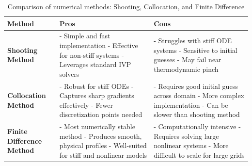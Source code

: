 \documentclass[a4paper,fleqn]{cas-sc}
\begin{document}
    \begin{table}[ht]
        \centering
        \scriptsize
        \renewcommand{\arraystretch}{1.5}
        \caption{Comparison of numerical methods: Shooting, Collocation, and Finite Difference}
        \label{tab:method_comparison_table}
        \begin{tabular}{|>{\centering\arraybackslash}m{3.5cm}|p{6cm}|p{6cm}|}
            \hline
            \textbf{Method} & \textbf{Pros} & \textbf{Cons} \\
            \hline
            \textbf{Shooting Method} &
            - Simple and fast implementation \newline
            - Effective for non-stiff systems \newline
            - Leverages standard IVP solvers
            &
            - Struggles with stiff ODE systems \newline
            - Sensitive to initial guesses \newline
            - May fail near thermodynamic pinch \\
            \hline
            \textbf{Collocation Method} &
            - Robust for stiff ODEs \newline
            - Captures sharp gradients effectively \newline
            - Fewer discretization points needed
            &
            - Requires good initial guess across domain \newline
            - More complex implementation \newline
            - Can be slower than shooting method \\
            \hline
            \textbf{Finite Difference Method} &
            - Most numerically stable method \newline
            - Produces smooth, physical profiles \newline
            - Well-suited for stiff and nonlinear models
            &
            - Computationally intensive \newline
            - Requires solving large nonlinear systems \newline
            - More difficult to scale for large grids \\
            \hline
        \end{tabular}
    \end{table}
\end{document}

